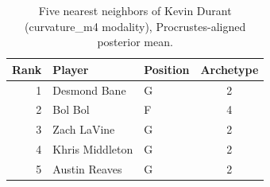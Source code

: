 \begin{table}[htbp]
  \centering\small
  \begin{tabular}{rllc}
    \toprule
    Rank & Player & Position & Archetype \\
    \midrule
    1 & Desmond Bane & G & 2 \\
    2 & Bol Bol & F & 4 \\
    3 & Zach LaVine & G & 2 \\
    4 & Khris Middleton & G & 2 \\
    5 & Austin Reaves & G & 2 \\
    \bottomrule
  \end{tabular}
  \caption{Five nearest neighbors of Kevin Durant (curvature_m4 modality), Procrustes-aligned posterior mean.}
  \label{tab:Kevin_Durant_neighbors_curvature_m4}
\end{table}

